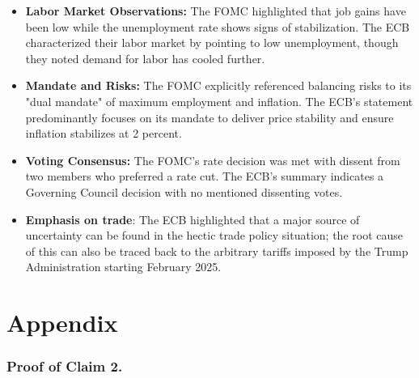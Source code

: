 \documentclass[dvipsnames,11pt]{article}
\begin{document}
\begin{enumerate}
\begin{solution}
\begin{itemize}
                        \item \textbf{Labor Market Observations:} The FOMC highlighted that job gains have been low while the unemployment rate shows signs of stabilization. The ECB characterized their labor market by pointing to low unemployment, though they noted demand for labor has cooled further.
                        
                        \item \textbf{Mandate and Risks:} The FOMC explicitly referenced balancing risks to its "dual mandate" of maximum employment and inflation. The ECB's statement predominantly focuses on its mandate to deliver price stability and ensure inflation stabilizes at 2 percent.
                        
                        \item \textbf{Voting Consensus:} The FOMC's rate decision was met with dissent from two members who preferred a rate cut. The ECB's summary indicates a Governing Council decision with no mentioned dissenting votes.

                        \item \textbf{Emphasis on trade}: The ECB highlighted that a major source of uncertainty can be found in the hectic trade policy situation; the root cause of this can also be traced back to the arbitrary tariffs imposed by the Trump Administration starting February 2025.
                    \end{itemize}
                
            \end{solution}
        \end{enumerate}

\appendix
\section*{Appendix}
\subsubsection*{Proof of Claim 2.}


\end{document}
